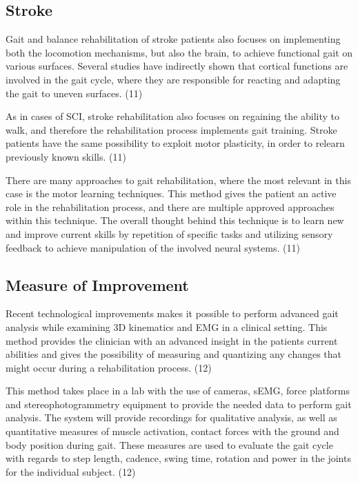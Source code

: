 \subsection{Stroke}

Gait and balance rehabilitation of stroke patients also focuses on implementing both the locomotion mechanisms, but also the brain, to achieve functional gait on various surfaces. Several studies have indirectly shown that cortical functions are involved in the gait cycle, where they are responsible for reacting and adapting the gait to uneven surfaces. (11)

As in cases of SCI, stroke rehabilitation also focuses on regaining the ability to walk, and therefore the rehabilitation process implements gait training. Stroke patients have the same possibility to exploit motor plasticity, in order to relearn previously known skills. (11)

There are many approaches to gait rehabilitation, where the most relevant in this case is the motor learning techniques. This method gives the patient an active role in the rehabilitation process, and there are multiple approved approaches within this technique. The overall thought behind this technique is to learn new and improve current skills by repetition of specific tasks and utilizing sensory feedback to achieve manipulation of the involved neural systems. (11)

\subsection{Measure of Improvement}

Recent technological improvements makes it possible to perform advanced gait analysis while examining 3D kinematics and EMG in a clinical setting. This method provides the clinician with an advanced insight in the patients current abilities and gives the possibility of measuring and quantizing any changes that might occur during a rehabilitation process. (12)

This method takes place in a lab with the use of cameras, sEMG, force platforms and stereophotogrammetry equipment to provide the needed data to perform gait analysis. The system will provide recordings for qualitative analysis, as well as quantitative measures of muscle activation, contact forces with the ground and body position during gait. These measures are used to evaluate the gait cycle with regards to step length, cadence, swing time, rotation and power in the joints for the individual subject. (12)

